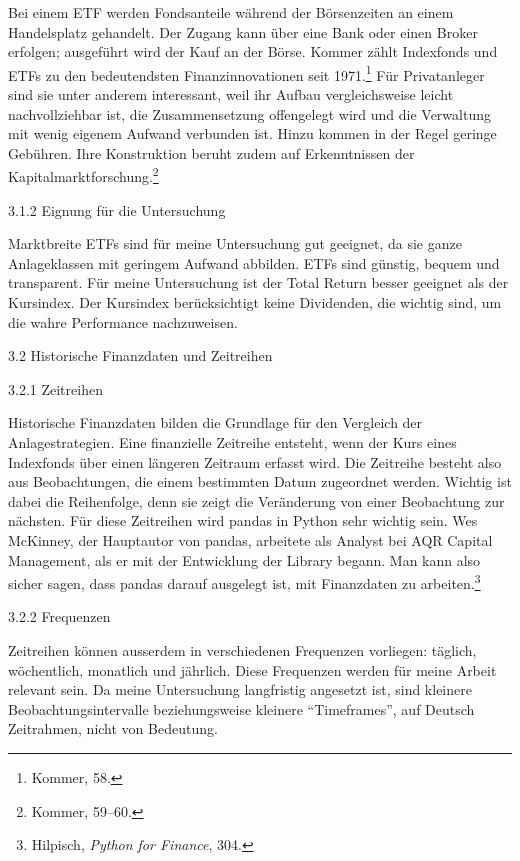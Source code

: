 \documentclass[
  ngerman,
  a4paper,
  DIV=11,
  oneside]{scrreprt}
\begin{document}
Bei einem ETF werden Fondsanteile während der Börsenzeiten an einem
Handelsplatz gehandelt. Der Zugang kann über eine Bank oder einen Broker
erfolgen; ausgeführt wird der Kauf an der Börse. Kommer zählt Indexfonds
und ETFs zu den bedeutendsten Finanzinnovationen seit 1971.\footnote{Kommer,
  58.} Für Privatanleger sind sie unter anderem interessant, weil ihr
Aufbau vergleichsweise leicht nachvollziehbar ist, die Zusammensetzung
offengelegt wird und die Verwaltung mit wenig eigenem Aufwand verbunden
ist. Hinzu kommen in der Regel geringe Gebühren. Ihre Konstruktion
beruht zudem auf Erkenntnissen der Kapitalmarktforschung.\footnote{Kommer,
  59--60.}

3.1.2 Eignung für die Untersuchung

Marktbreite ETFs sind für meine Untersuchung gut geeignet, da sie ganze
Anlageklassen mit geringem Aufwand abbilden. ETFs sind günstig, bequem
und transparent. Für meine Untersuchung ist der Total Return besser
geeignet als der Kursindex. Der Kursindex berücksichtigt keine
Dividenden, die wichtig sind, um die wahre Performance nachzuweisen.

3.2 Historische Finanzdaten und Zeitreihen

3.2.1 Zeitreihen

Historische Finanzdaten bilden die Grundlage für den Vergleich der
Anlagestrategien. Eine finanzielle Zeitreihe entsteht, wenn der Kurs
eines Indexfonds über einen längeren Zeitraum erfasst wird. Die
Zeitreihe besteht also aus Beobachtungen, die einem bestimmten Datum
zugeordnet werden. Wichtig ist dabei die Reihenfolge, denn sie zeigt die
Veränderung von einer Beobachtung zur nächsten. Für diese Zeitreihen
wird pandas in Python sehr wichtig sein. Wes McKinney, der Hauptautor
von pandas, arbeitete als Analyst bei AQR Capital Management, als er mit
der Entwicklung der Library begann. Man kann also sicher sagen, dass
pandas darauf ausgelegt ist, mit Finanzdaten zu arbeiten.\footnote{Hilpisch,
  \emph{Python for Finance}, 304.}

3.2.2 Frequenzen

Zeitreihen können ausserdem in verschiedenen Frequenzen vorliegen:
täglich, wöchentlich, monatlich und jährlich. Diese Frequenzen werden
für meine Arbeit relevant sein. Da meine Untersuchung langfristig
angesetzt ist, sind kleinere Beobachtungsintervalle beziehungsweise
kleinere ``Timeframes'', auf Deutsch Zeitrahmen, nicht von Bedeutung.
\end{document}
